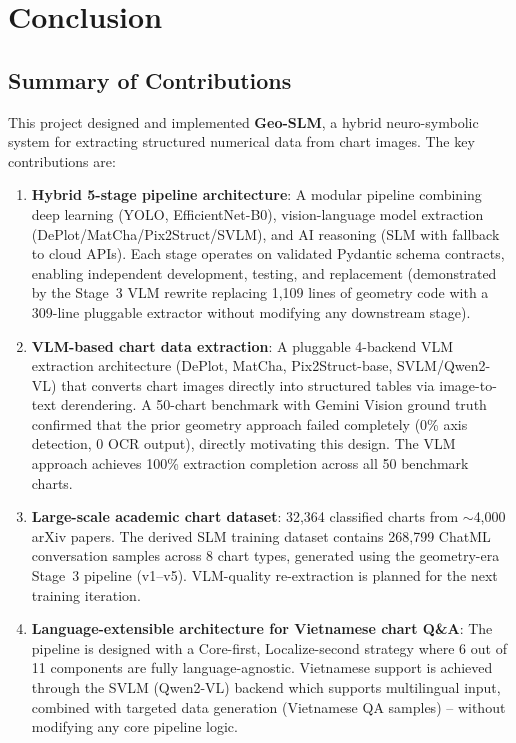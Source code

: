 \section{Conclusion}

\subsection{Summary of Contributions}

This project designed and implemented \textbf{Geo-SLM}, a hybrid neuro-symbolic system
for extracting structured numerical data from chart images. The key contributions are:

\begin{enumerate}
    \item \textbf{Hybrid 5-stage pipeline architecture}: A modular pipeline combining
          deep learning (YOLO, EfficientNet-B0), vision-language model extraction
          (DePlot/MatCha/Pix2Struct/SVLM), and AI reasoning (SLM with fallback to
          cloud APIs). Each stage operates on validated Pydantic schema contracts,
          enabling independent development, testing, and replacement
          (demonstrated by the Stage~3 VLM rewrite replacing 1,109 lines of geometry
          code with a 309-line pluggable extractor without modifying any downstream stage).

    \item \textbf{VLM-based chart data extraction}: A pluggable 4-backend VLM extraction
          architecture (DePlot, MatCha, Pix2Struct-base, SVLM/Qwen2-VL) that converts
          chart images directly into structured tables via image-to-text derendering.
          A 50-chart benchmark with Gemini Vision ground truth confirmed that the prior
          geometry approach failed completely (0\% axis detection, 0 OCR output), directly
          motivating this design. The VLM approach achieves 100\% extraction completion
          across all 50 benchmark charts.

    \item \textbf{Large-scale academic chart dataset}: 32,364 classified charts from
          $\sim$4,000 arXiv papers. The derived SLM training dataset contains 268,799
          ChatML conversation samples across 8 chart types, generated using the
          geometry-era Stage~3 pipeline (v1--v5). VLM-quality re-extraction is planned
          for the next training iteration.

    \item \textbf{Language-extensible architecture for Vietnamese chart Q\&A}: The
          pipeline is designed with a Core-first, Localize-second strategy where
          6 out of 11 components are fully language-agnostic. Vietnamese support is
          achieved through the SVLM (Qwen2-VL) backend which supports multilingual
          input, combined with targeted data generation (Vietnamese QA samples)
          -- without modifying any core pipeline logic.


\end{enumerate}
